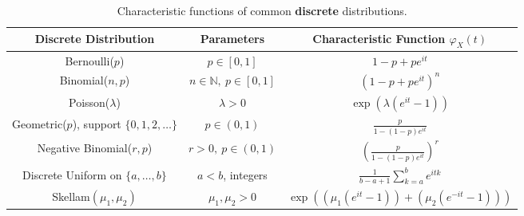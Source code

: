 \documentclass[11pt,a4paper]{article}
\theoremstyle{definition}
\begin{document}
\begin{table}[h]
\centering
\renewcommand{\arraystretch}{1.4}
\begin{tabular}{|c|c|c|}
\hline
\textbf{Discrete Distribution} & \textbf{Parameters} & \textbf{Characteristic Function $\varphi_X(t)$} \\
\hline

Bernoulli($p$)
& $p\in[0,1]$
& $1-p + p e^{it}$ \\
\hline

Binomial($n,p$)
& $n\in\mathbb{N},\ p\in[0,1]$
& $(1 - p + p e^{it})^{n}$ \\
\hline

Poisson($\lambda$)
& $\lambda>0$
& $\exp\!\left(\lambda(e^{it} - 1)\right)$ \\
\hline

Geometric($p$), support $\{0,1,2,\dots\}$
& $p\in(0,1)$
& $\displaystyle \frac{p}{1 - (1-p)e^{it}}$ \\
\hline

Negative Binomial($r,p$)
& $r>0,\ p\in(0,1)$
& $\left(\frac{p}{1-(1-p)e^{it}}\right)^r$ \\
\hline

Discrete Uniform on $\{a,\dots,b\}$
& $a<b$, integers
& $\displaystyle 
\frac{1}{b-a+1} \sum_{k=a}^{b} e^{itk}$ \\
\hline

Skellam$(\mu_1,\mu_2)$
& $\mu_1,\mu_2>0$
& $\exp\!\left((\mu_1(e^{it}-1)) + (\mu_2(e^{-it}-1))\right)$ \\
\hline

\end{tabular}
\caption{Characteristic functions of common \textbf{discrete} distributions.}
\end{table}

\newpage
\end{document}
